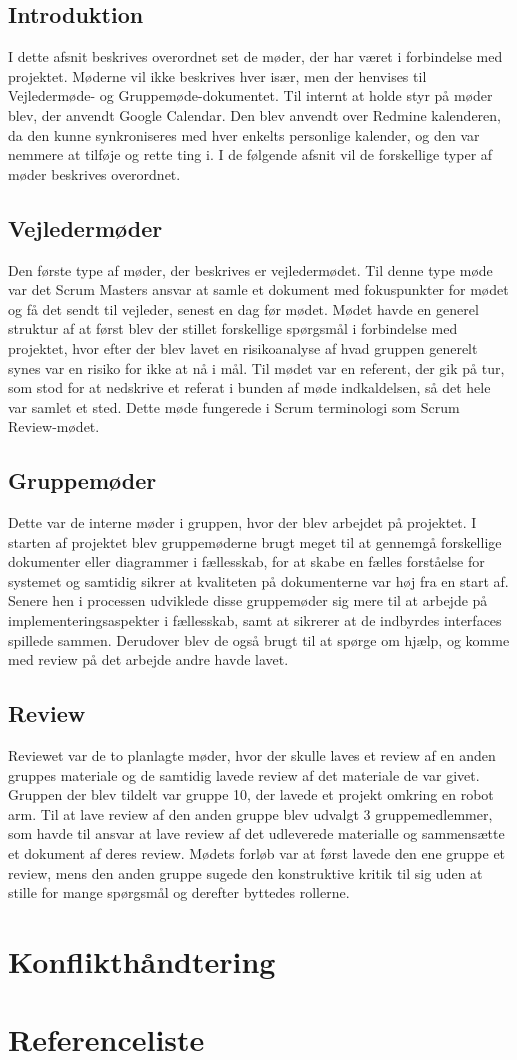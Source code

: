 \documentclass[a4paper,12pt,fleqn,oneside]{article}
\begin{document}
\subsection{Introduktion}
I dette afsnit beskrives overordnet set de møder, der har været i forbindelse med projektet. Møderne vil ikke beskrives hver især, men der henvises til Vejledermøde- og Gruppemøde-dokumentet. Til internt at holde styr på møder blev, der anvendt Google Calendar. Den blev anvendt over Redmine kalenderen, da den kunne synkroniseres med hver enkelts personlige kalender, og den var nemmere at tilføje og rette ting i. I de følgende afsnit vil de forskellige typer af møder beskrives overordnet.
\subsection{Vejledermøder}
Den første type af møder, der beskrives er vejledermødet. Til denne type møde var det Scrum Masters ansvar at samle et dokument med fokuspunkter for mødet og få det sendt til vejleder, senest en dag før mødet. Mødet havde en generel struktur af at først blev der stillet forskellige spørgsmål i forbindelse med projektet, hvor efter der blev lavet en risikoanalyse af hvad gruppen generelt synes var en risiko for ikke at nå i mål. Til mødet var en referent, der gik på tur, som stod for at nedskrive et referat i bunden af møde indkaldelsen, så det hele var samlet et sted. Dette møde fungerede i Scrum terminologi som Scrum Review-mødet.
\subsection{Gruppemøder}
Dette var de interne møder i gruppen, hvor der blev arbejdet på projektet. I starten af projektet blev gruppemøderne brugt meget til at gennemgå forskellige dokumenter eller diagrammer i fællesskab, for at skabe en fælles forståelse for systemet og samtidig sikrer at kvaliteten på dokumenterne var høj fra en start af. Senere hen i processen udviklede disse gruppemøder sig mere til at arbejde på implementeringsaspekter i fællesskab, samt at sikrerer at de indbyrdes interfaces spillede sammen. Derudover blev de også brugt til at spørge om hjælp, og komme med review på det arbejde andre havde lavet.
\subsection{Review}
Reviewet var de to planlagte møder, hvor der skulle laves et review af en anden gruppes materiale og de samtidig lavede review af det materiale de var givet. Gruppen der blev tildelt var gruppe 10, der lavede et projekt omkring en robot arm. Til at lave review af den anden gruppe blev udvalgt 3 gruppemedlemmer, som havde til ansvar at lave review af det udleverede materialle og sammensætte et dokument af deres review.  Mødets forløb var at først lavede den ene gruppe et review, mens den anden gruppe sugede den konstruktive kritik til sig uden at stille for mange spørgsmål og derefter byttedes rollerne. 

\section{Konflikthåndtering}

\section{Referenceliste}
\end{document}
